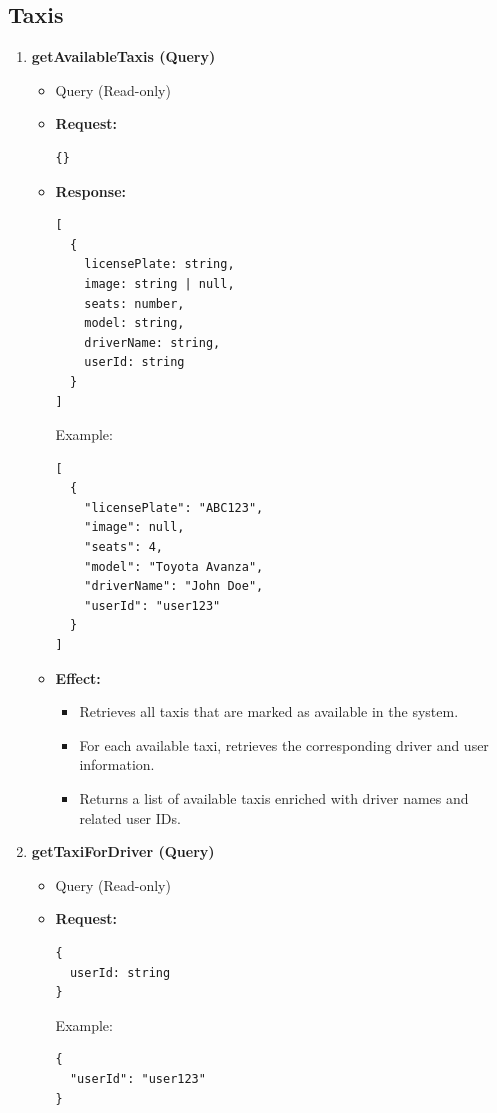 \documentclass[a4paper,12pt]{article}
\begin{document}
\subsection*{Taxis}

\begin{enumerate}

  \item \textbf{getAvailableTaxis (Query)}
    \begin{itemize}
      \item Query (Read-only)
      \item \textbf{Request:}
      \begin{verbatim}
{}
      \end{verbatim}
      \item \textbf{Response:}
      \begin{verbatim}
[
  {
    licensePlate: string,
    image: string | null,
    seats: number,
    model: string,
    driverName: string,
    userId: string
  }
]
      \end{verbatim}
      Example:
      \begin{verbatim}
[
  {
    "licensePlate": "ABC123",
    "image": null,
    "seats": 4,
    "model": "Toyota Avanza",
    "driverName": "John Doe",
    "userId": "user123"
  }
]
      \end{verbatim}
      \item \textbf{Effect:}
      \begin{itemize}
        \item Retrieves all taxis that are marked as available in the system.
        \item For each available taxi, retrieves the corresponding driver and user information.
        \item Returns a list of available taxis enriched with driver names and related user IDs.
      \end{itemize}
    \end{itemize}

\item \textbf{getTaxiForDriver (Query)}
    \begin{itemize}
      \item Query (Read-only)
      \item \textbf{Request:}
      \begin{verbatim}
{
  userId: string
}
      \end{verbatim}
      Example:
      \begin{verbatim}
{
  "userId": "user123"
}
      \end{verbatim}


\end{itemize}
\end{enumerate}
\end{document}
